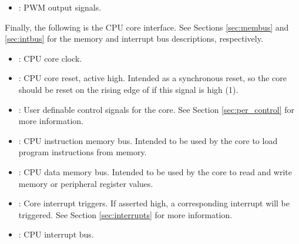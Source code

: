 \begin{itemize}
    \item {}: PWM output signals.
\end{itemize}
Finally, the following is the CPU core interface. See Sections \ref{sec:membus} and \ref{sec:intbus} for the memory and interrupt bus descriptions, respectively.
\begin{itemize}
    \item {}: CPU core clock.
    \item {}: CPU core reset, active high. Intended as a synchronous reset, so the core should be reset on the rising edge of  if this signal is high (1).
    \item {}: User definable control signals for the core. See Section \ref{sec:per_control} for more information.
    \item {}: CPU instruction memory bus. Intended to be used by the core to load program instructions from memory.
    \item {}: CPU data memory bus. Intended to be used by the core to read and write memory or peripheral register values.
    \item {}: Core interrupt triggers. If asserted high, a corresponding interrupt will be triggered. See Section \ref{sec:interrupts} for more information.
    \item {}: CPU interrupt bus.
\end{itemize}